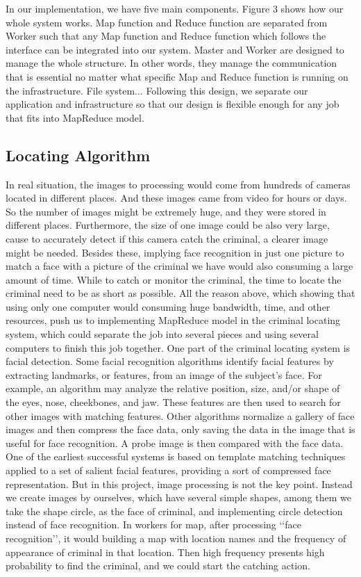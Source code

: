 \documentclass[12pt]{article}
\begin{document}
In our implementation, we have five main components.  Figure 3 shows how our whole system works.
Map function and Reduce function are separated from Worker such that any Map function and Reduce function which
follows the interface can be integrated into our system.
Master and Worker are designed to manage the whole structure. In other words, they manage the communication that
is essential no matter what specific Map and Reduce function is running on the infrastructure.
File system...
Following this design, we separate our application and infrastructure so that our design is flexible enough
for any job that fits into MapReduce model. 
\subsection{Locating Algorithm }

In real situation, the images to processing would come from hundreds of cameras located in different places. And these images came from video for hours or days. So the number of images might be extremely huge, and they were stored in different places. Furthermore, the size of one image could be also very large, cause to accurately detect if this camera catch the criminal, a clearer image might be needed. Besides these, implying face recognition in just one picture to match a face with a picture of the criminal we have would also consuming a large amount of time. While to catch or monitor the criminal, the time to locate the criminal need to be as short as possible. All the reason above, which showing that using only one computer would consuming huge bandwidth, time, and other resources, push us to implementing MapReduce model in the criminal locating system, which could separate the job into several pieces and using several computers to finish this job together. 
One part of the criminal locating system is facial detection. Some facial recognition algorithms identify facial features by extracting landmarks, or features, from an image of the subject's face. For example, an algorithm may analyze the relative position, size, and/or shape of the eyes, nose, cheekbones, and jaw. These features are then used to search for other images with matching features. Other algorithms normalize a gallery of face images and then compress the face data, only saving the data in the image that is useful for face recognition. A probe image is then compared with the face data. One of the earliest successful systems is based on template matching techniques applied to a set of salient facial features, providing a sort of compressed face representation.
But in this project, image processing is not the key point. Instead we create images by ourselves, which have several simple shapes, among them we take the shape circle, as the face of criminal, and implementing circle detection instead of face recognition. 
In workers for map, after processing \lq\lq face recognition\rq\rq, it would building a map with location names and the frequency of appearance of criminal in that location. Then high frequency presents high probability to find the criminal, and we could start the catching action. 
\end{document}
